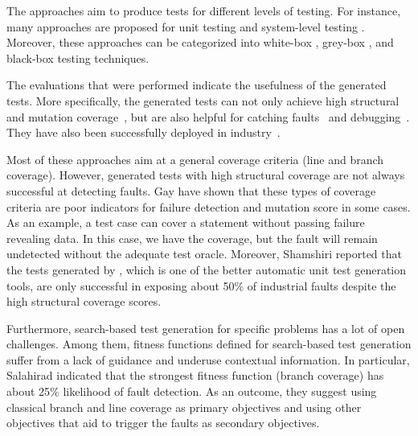 The approaches aim to produce tests for different levels of testing. For instance, many approaches are proposed for unit testing \cite{Fraser2011, braione2017tardis, braione2018sushi, prasetya2013t3} and system-level testing \cite{Arcuri2019, Holler2012, Padhye2019, beyene2012, coppit2005, godefroid2008}. Moreover, these approaches can be categorized into white-box \cite{Fraser2011, braione2017tardis, braione2018sushi, prasetya2013t3, Arcuri2019}, grey-box \cite{Ghamizi2020, medicherla2020fitness, korel1996assertion, tracey2000automated}, and black-box \cite{Holler2012, Padhye2019, beyene2012, coppit2005, godefroid2008} testing techniques. 

The evaluations that were performed indicate the usefulness of the generated tests. More specifically, the generated tests can not only achieve high structural and mutation coverage~\cite{Panichella2018a, Fraser2014b}, but are also helpful for catching faults~\cite{Shamshiri2016} and debugging~\cite{Ceccato2015}. They have also been successfully deployed in industry~\cite{Alshahwan2018, almasi2017industrial}.

Most of these approaches aim at a general coverage criteria (\eg line and branch coverage). However,  generated tests with high structural coverage are not always successful at detecting faults. Gay \etal \cite{gay2015risks} have shown that these types of coverage criteria are poor indicators for failure detection and mutation score in some cases. As an example, a test case can cover a statement without passing failure revealing data. In this case, we have the coverage, but the fault will remain undetected without the adequate test oracle.
Moreover, Shamshiri \etal \cite{Shamshiri2016} reported that the tests generated by \evosuite, which is one of the better automatic unit test generation tools, are only successful in exposing about 50\% of industrial faults despite the high structural coverage scores. 

Furthermore, search-based test generation for specific problems has a lot of open challenges. Among them, fitness functions defined for search-based test generation suffer from a lack of guidance and underuse contextual information.  
In particular, Salahirad \etal \cite{Salahirad2019} indicated that the strongest fitness function (branch coverage) has about 25\% likelihood of fault detection.
As an outcome, they suggest using classical branch and line coverage as primary objectives and using other objectives that aid to trigger the faults as secondary objectives.

